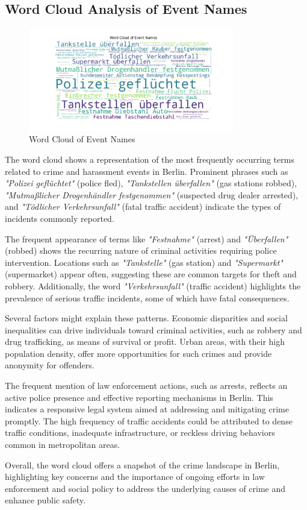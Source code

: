 \subsection{Word Cloud Analysis of Event Names}

\begin{figure}[!h]
    \centering
    \includegraphics[width=0.8\textwidth]{./figures/intro_rishabh/Bag_of_words.png}
    \caption{Word Cloud of Event Names}
    \label{fig:wordcloud}
\end{figure}

The word cloud shows a representation of the most frequently occurring terms related to crime and harassment events in Berlin. Prominent phrases such as \textit{"Polizei geflüchtet"} (police fled), \textit{"Tankstellen überfallen"} (gas stations robbed), \textit{"Mutmaßlicher Drogenhändler festgenommen"} (suspected drug dealer arrested), and \textit{"Tödlicher Verkehrsunfall"} (fatal traffic accident) indicate the types of incidents commonly reported.

The frequent appearance of terms like \textit{"Festnahme"} (arrest) and \textit{"Überfallen"} (robbed) shows the recurring nature of criminal activities requiring police intervention. Locations such as \textit{"Tankstelle"} (gas station) and \textit{"Supermarkt"} (supermarket) appear often, suggesting these are common targets for theft and robbery. Additionally, the word \textit{"Verkehrsunfall"} (traffic accident) highlights the prevalence of serious traffic incidents, some of which have fatal consequences.

Several factors might explain these patterns. Economic disparities and social inequalities can drive individuals toward criminal activities, such as robbery and drug trafficking, as means of survival or profit. Urban areas, with their high population density, offer more opportunities for such crimes and provide anonymity for offenders.

The frequent mention of law enforcement actions, such as arrests, reflects an active police presence and effective reporting mechanisms in Berlin. This indicates a responsive legal system aimed at addressing and mitigating crime promptly. The high frequency of traffic accidents could be attributed to dense traffic conditions, inadequate infrastructure, or reckless driving behaviors common in metropolitan areas.

Overall, the word cloud offers a snapshot of the crime landscape in Berlin, highlighting key concerns and the importance of ongoing efforts in law enforcement and social policy to address the underlying causes of crime and enhance public safety.